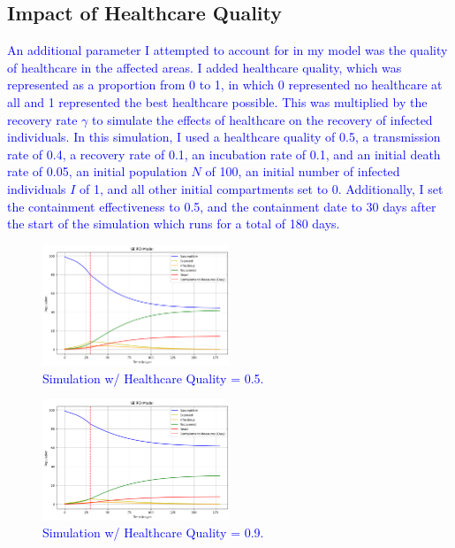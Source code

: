 \documentclass[%
 reprint,
superscriptaddress,
 amsmath,amssymb,
 aps,
]{revtex4-2}
\begin{document}
\subsection{Impact of Healthcare Quality}
\textcolor{blue}{An additional parameter I attempted to account for in my model was the quality of healthcare in the affected areas. I added healthcare quality, which was represented as a proportion from 0 to 1, in which 0 represented no healthcare at all and 1 represented the best healthcare possible. This was multiplied by the recovery rate $\gamma$ to simulate the effects of healthcare on the recovery of infected individuals.
In this simulation, I used a healthcare quality of 0.5, a transmission rate of 0.4, a recovery rate of 0.1, an incubation rate of 0.1, and an initial death rate of 0.05, an initial population $N$ of 100, an initial number of infected individuals $I$ of 1, and all other initial compartments set to 0. Additionally, I set the containment effectiveness to 0.5, and the containment date to 30 days after the start of the simulation which runs for a total of 180 days.
\begin{figure}[hbt!]
    \centering
    \includegraphics[width=0.5\textwidth]{HealthcareA.png}
    \caption{Simulation w/ Healthcare Quality = 0.5.}
    \label{HealthcareA}
\end{figure}
\begin{figure}[hbt!]
    \centering
    \includegraphics[width=0.5\textwidth]{HealthcareB.png}
    \caption{Simulation w/ Healthcare Quality = 0.9.}
    \label{HealthcareB}
\end{figure}
\begin{figure}[hbt!]
    \centering

\end{figure}}
\end{document}
